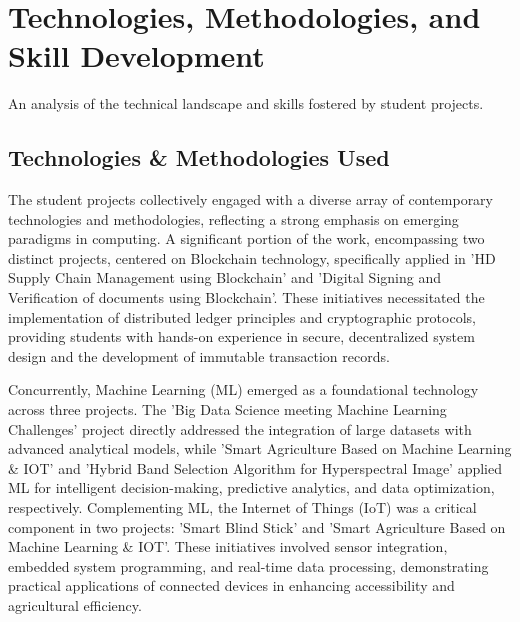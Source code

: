 \documentclass[11pt,a4paper]{article}
\newenvironment{card}{
    \begin{tcolorbox}[
        enhanced,
        colback=cardback,
        colframe=border,
        sharp corners,
        boxrule=0.5pt,
        drop shadow,
        drop shadow={shadow xshift=1mm,shadow yshift=-1mm,fill=border!50},
        boxsep=3mm,
        left=5mm, right=5mm, top=5mm, bottom=5mm,
        width=\textwidth,
        nobeforeafter
    ]
}{\end{tcolorbox}}
\begin{document}
\clearpage

\section*{\textcolor{accent}{Technologies, Methodologies, and Skill Development}}
{\large\textcolor{muted}{An analysis of the technical landscape and skills fostered by student projects.}}

\vspace{0.5cm}

\begin{card}
    \subsection*{\textcolor{accent}{Technologies \& Methodologies Used}}
    \vspace{0.3cm}
    The student projects collectively engaged with a diverse array of contemporary technologies and methodologies, reflecting a strong emphasis on emerging paradigms in computing. A significant portion of the work, encompassing two distinct projects, centered on Blockchain technology, specifically applied in 'HD Supply Chain Management using Blockchain' and 'Digital Signing and Verification of documents using Blockchain'. These initiatives necessitated the implementation of distributed ledger principles and cryptographic protocols, providing students with hands-on experience in secure, decentralized system design and the development of immutable transaction records.

    Concurrently, Machine Learning (ML) emerged as a foundational technology across three projects. The 'Big Data Science meeting Machine Learning Challenges' project directly addressed the integration of large datasets with advanced analytical models, while 'Smart Agriculture Based on Machine Learning \& IOT' and 'Hybrid Band Selection Algorithm for Hyperspectral Image' applied ML for intelligent decision-making, predictive analytics, and data optimization, respectively. Complementing ML, the Internet of Things (IoT) was a critical component in two projects: 'Smart Blind Stick' and 'Smart Agriculture Based on Machine Learning \& IOT'. These initiatives involved sensor integration, embedded system programming, and real-time data processing, demonstrating practical applications of connected devices in enhancing accessibility and agricultural efficiency.


\end{card}
\end{document}
